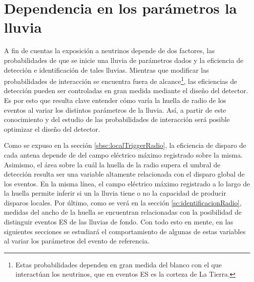 	
% 		
% 	
% 	
% 	
% 	
% 		
	
% 	
% 	
	\section{Dependencia en los par\'ametros la lluvia}
	
	A fin de cuentas la exposici\'on a neutrinos depende de dos factores, las probabilidades de que se inicie una lluvia de par\'ametros dados y la eficiencia de detecci\'on e identificaci\'on de tales lluvias.
	Mientras que modificar las probabilidades de interacci\'on se encuentra fuera de alcance\footnote{Estas probabilidades dependen en gran medida del blanco con el que interact\'uan los neutrinos, que en eventos ES es la corteza de La Tierra.}, las eficiencias de detecci\'on pueden ser controladas en gran medida mediante el dise\~no del detector. 
	Es por esto que resulta clave entender c\'omo var\'ia la huella de radio de los eventos al variar los distintos par\'ametros de la lluvia.
	As\'i, a partir de este conocimiento y del estudio de las probabilidades de interacci\'on ser\'a posible optimizar el dise\~no del detector.
	
	Como se expuso en la secci\'on \ref{sbsc:localTriggerRadio}, la eficiencia de disparo de cada antena depende de del campo el\'ectrico m\'aximo registrado sobre la misma.
	Asimismo, el \'area sobre la cu\'al la huella de la radio supera el umbral de detecci\'on resulta ser una variable altamente relacionada con el disparo global de los eventos.
	En la misma l\'inea, el campo el\'ectrico m\'aximo registrado a lo largo de la huella permite inferir si un la lluvia tiene o no la capacidad de producir disparos locales.
	Por \'ultimo, como se ver\'a en la secci\'on \ref{sc:identificacionRadio}, medidas del ancho de la huella se encuentran relacionadas con la posibilidad de distinguir eventos ES de las lluvias de fondo.
	Con todo esto en mente, en las siguientes secciones se estudiar\'a el comportamiento de algunas de estas variables al variar los par\'ametros del evento de referencia.
	
